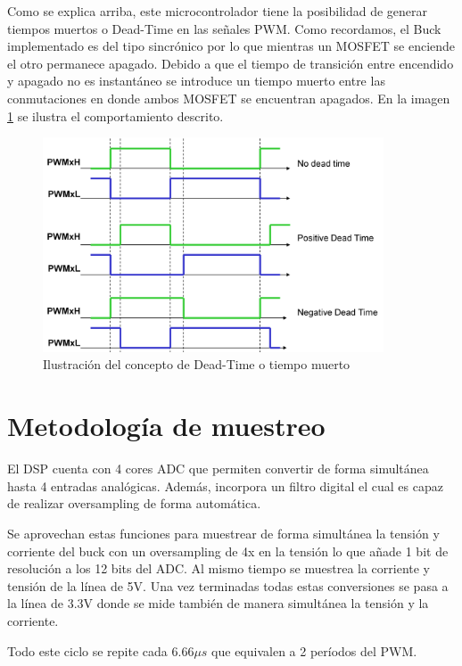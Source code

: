 \documentclass[12pt]{report}
\begin{document}
Como se explica arriba, este microcontrolador tiene la posibilidad de generar tiempos muertos o Dead-Time en las señales PWM. Como recordamos, el Buck implementado es del tipo sincrónico por lo que mientras un MOSFET se enciende el otro permanece apagado. Debido a que el tiempo de transición entre encendido y apagado no es instantáneo se introduce un tiempo muerto entre las conmutaciones en donde ambos MOSFET se encuentran apagados. En la imagen \ref{deadtime} se ilustra el comportamiento descrito.

\begin{figure}[H]
	\centering
	\includegraphics[width=0.9\textwidth,height=\textheight,keepaspectratio]{deadtime}
	\caption{Ilustración del concepto de Dead-Time o tiempo muerto}
	\label{deadtime}
\end{figure}

\section{Metodología de muestreo}

El DSP cuenta con 4 cores ADC que permiten convertir de forma simultánea hasta 4 entradas analógicas. Además, incorpora un filtro digital el cual es capaz de realizar oversampling de forma automática. 

Se aprovechan estas funciones para muestrear de forma simultánea la tensión y corriente del buck con un oversampling de 4x en la tensión lo que añade 1 bit de resolución a los 12 bits del ADC. Al mismo tiempo se muestrea la corriente y tensión de la línea de 5V. Una vez terminadas todas estas conversiones se pasa a la línea de 3.3V donde se mide también de manera simultánea la tensión y la corriente.

Todo este ciclo se repite cada $6.66 \mu s$ que equivalen a 2 períodos del PWM.
\end{document}
